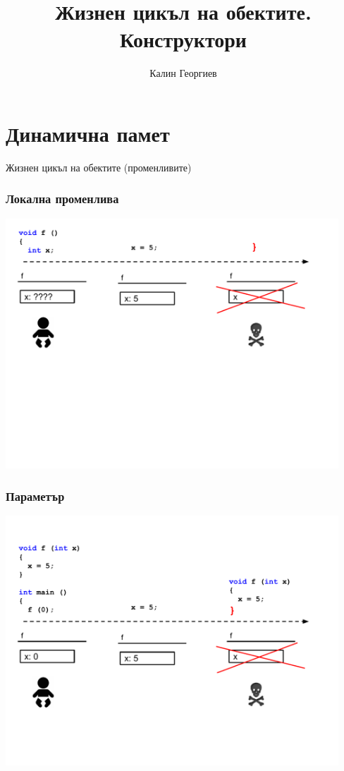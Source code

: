 \documentclass{beamer}
\begin{document}
\title[Обектно ориентирано програмиране]{Жизнен цикъл на обектите. Конструктори} 
\author{Калин Георгиев} 
\frame{\titlepage} 

\section{Динамична памет} 


\begin{frame}
\centerline{Жизнен цикъл на обектите (променливите)}
\end{frame}


\begin{frame}[fragile]
\frametitle{Локална променлива}
\includegraphics[width=12.5cm]{images/lc_var}
\end{frame}


\begin{frame}[fragile]
\frametitle{Параметър}
\includegraphics[width=12.5cm]{images/lc_par}
\end{frame}
\end{document}

